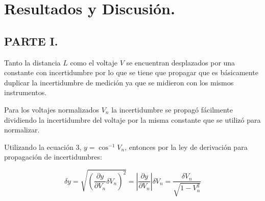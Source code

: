 \documentclass[DIV=calc, paper=a4, fontsize=11pt]{scrartcl}
\begin{document}
\section*{\textcolor{carmine}{Resultados y Discusión.}}

\subsection*{\textcolor{carmine}{PARTE I.}}

Tanto la distancia $L$ como el voltaje $V$ se encuentran desplazados por una constante con incertidumbre por lo que se tiene que propagar que es básicamente duplicar la incertidumbre de medición ya que se midieron con los mismos instrumentos.


Para los voltajes normalizados $V_n$ la incertidumbre se propagó fácilmente dividiendo la incertidumbre del voltaje por la misma constante que se utilizó para normalizar.


Utilizando la ecuación 3, $y= \cos^{-1}{V_n}$, entonces por la ley de derivación para propagación de incertidumbres:

\begin{equation*}
    \delta y = \sqrt{\left(\frac{\partial y}{\partial V_n} \delta V_n\right)^2} =\left| \frac{\partial y}{\partial V_n}\right| \delta V_n = \frac{\delta V_n}{\sqrt{1-V_{n}^{2}}} 
\end{equation*}
\end{document}
